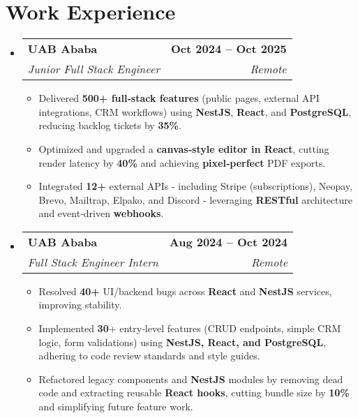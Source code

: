 \documentclass[letterpaper,11pt]{article}
\makeatletter
\newcommand{\resumeItem}[1]{
  \item\small{
    {#1 \vspace{0pt}}
  }
}
\newcommand{\resumeSubheading}[4]{
  \vspace{-2pt}\item
    \begin{tabular*}{1.0\textwidth}[t]{l@{\extracolsep{\fill}}r}
      \textbf{#1} & \textbf{\small #2} \\
      \textit{\small#3} & \textit{\small #4} \\
    \end{tabular*}\vspace{-7pt}
}
\newcommand{\resumeSubHeadingListStart}{\begin{itemize}[leftmargin=0.0in, label={}]}
\newcommand{\resumeSubHeadingListEnd}{\end{itemize}}\vspace{0pt}
\newcommand{\resumeItemListStart}{\begin{itemize}}
\newcommand{\resumeItemListEnd}{\end{itemize}\vspace{-5pt}}
\makeatother
\begin{document}
\vspace{-12pt}

\section{Work Experience}
    \resumeSubHeadingListStart
                \resumeSubheading{UAB Ababa}{Oct 2024 -- Oct 2025}{Junior Full Stack Engineer}{Remote} 
                \resumeItemListStart
                      \resumeItem{Delivered \textbf{500+ full‑stack features} (public pages, external API integrations, CRM workflows) using \textbf{NestJS}, \textbf{React}, and \textbf{PostgreSQL}, reducing backlog tickets by \textbf{35\%}.}
                    \resumeItem{Optimized and upgraded a \textbf{canvas‑style editor in React}, cutting render latency by \textbf{40\%} and achieving \textbf{pixel‑perfect} PDF exports.}
                    \resumeItem{Integrated \textbf{12+} external APIs - including Stripe (subscriptions), Neopay, Brevo, Mailtrap, Elpako, and Discord - leveraging \textbf{RESTful} architecture and event‑driven \textbf{webhooks}.}
                    \resumeItemListEnd
            \resumeSubheading{UAB Ababa}{Aug 2024 -- Oct 2024}{Full Stack Engineer Intern}{Remote} 
                \resumeItemListStart
                     \resumeItem{Resolved \textbf{40+} UI/backend bugs across \textbf{React} and \textbf{NestJS} services, improving stability.}
                    \resumeItem{Implemented \textbf{30}+ entry‑level features (CRUD endpoints, simple CRM logic, form validations) using \textbf{NestJS, React, and PostgreSQL}, adhering to code review standards and style guides.}
                    \resumeItem{Refactored legacy components and \textbf{NestJS} modules by removing dead code and extracting reusable \textbf{React hooks}, cutting bundle size by \textbf{10\%} and simplifying future feature work.}
                    \resumeItemListEnd
    \resumeSubHeadingListEnd
    \vspace{-12pt}

\end{document}
